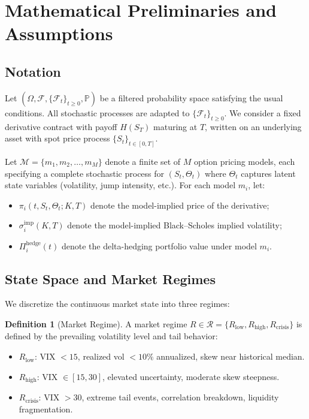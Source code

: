 \documentclass[11pt,a4paper]{article}
\theoremstyle{plain}
\theoremstyle{definition}
\newtheorem{definition}[theorem]{Definition}
\theoremstyle{remark}
\newcommand{\Pbb}{\mathbb{P}}
\newcommand{\F}{\mathcal{F}}
\newcommand{\M}{\mathcal{M}}
\begin{document}
\section{Mathematical Preliminaries and Assumptions}

\subsection{Notation}

Let $(\Omega, \F, \{\F_t\}_{t \geq 0}, \Pbb)$ be a filtered probability space satisfying the usual conditions. All stochastic processes are adapted to $\{\F_t\}_{t \geq 0}$. We consider a fixed derivative contract with payoff $H(S_T)$ maturing at $T$, written on an underlying asset with spot price process $\{S_t\}_{t \in [0,T]}$.

Let $\M = \{m_1, m_2, \dots, m_M\}$ denote a finite set of $M$ option pricing models, each specifying a complete stochastic process for $(S_t, \Theta_t)$ where $\Theta_t$ captures latent state variables (volatility, jump intensity, etc.). For each model $m_i$, let:

\begin{itemize}[nosep]
  \item $\pi_i(t, S_t, \Theta_t; K, T)$ denote the model-implied price of the derivative;
  \item $\sigma_i^{\text{imp}}(K, T)$ denote the model-implied Black--Scholes implied volatility;
  \item $\Pi_i^{\text{hedge}}(t)$ denote the delta-hedging portfolio value under model $m_i$.
\end{itemize}

\subsection{State Space and Market Regimes}

We discretize the continuous market state into three regimes:

\begin{definition}[Market Regime]\label{def:regime}
A market regime $R \in \mathcal{R} = \{R_{\text{low}}, R_{\text{high}}, R_{\text{crisis}}\}$ is defined by the prevailing volatility level and tail behavior:
\begin{itemize}[nosep]
  \item $R_{\text{low}}$: VIX $< 15$, realized vol $< 10\%$ annualized, skew near historical median.
  \item $R_{\text{high}}$: VIX $\in [15, 30]$, elevated uncertainty, moderate skew steepness.
  \item $R_{\text{crisis}}$: VIX $> 30$, extreme tail events, correlation breakdown, liquidity fragmentation.
\end{itemize}
\end{definition}
\end{document}
